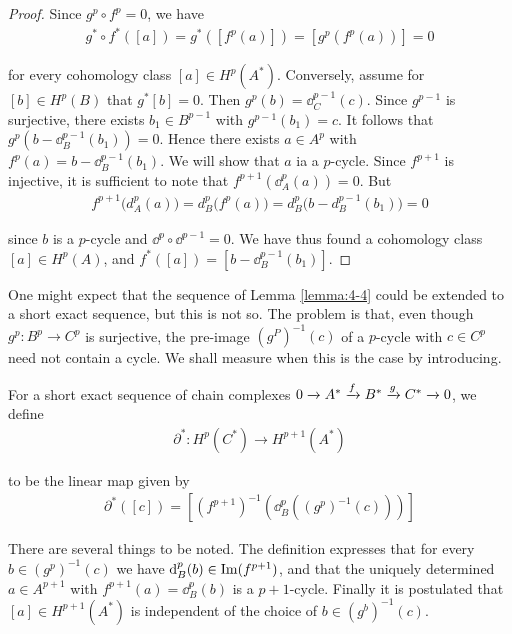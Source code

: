 \begin{proof}
  Since $g^p\circ f^p=0$, we have
  \begin{align*}
    g^*\circ f^*([ a ])=g^*([f^p(a)])=[g^p(f^p(a))]=0
  \end{align*}

  for every cohomology class $[a]\in H^p(A^*)$. Conversely, assume for $[b]\in H^p(B)$ that
  $g^*[b] = 0$. Then $g^p(b) = \dd^{p-1}_C(c)$. Since $g^{p-1}$ is surjective, there exists
  $b_1\in B^{p-1}$ with $g^{p-1}(b_1) = c$. It follows that $g^p(b-\dd^{p-1}_B(b_1)) = 0$. Hence
  there exists $a\in A^p$ with $f^p(a) = b-\dd^{p-1}_B(b_1)$. We will show that $a$ ia a $p$-cycle.
  Since $f^{p+1}$ is injective, it is sufficient to note that $f^{p+1}(\dd^p_A(a)) = 0$. But
  \begin{align*}
    f^{p+1}\big(d_A^p(a)\big)=d_B^p\big(f^p(a)\big)=d_B^p\big(b-d_B^{p-1}(b_1)\big) = 0
  \end{align*}

  since $b$ is a $p$-cycle and $\dd^p\circ\dd^{p-1} = 0$. We have thus found a cohomology class
  $[a]\in H^p(A)$, and $f^*([a]) = [b - \dd^{p-1}_B(b_1)]$.
\end{proof}


One might expect that the sequence of Lemma \ref{lemma:4-4} could be extended to a short
exact sequence, but this is not so. The problem is that, even though $g^p:B^p\to C^p$
is surjective, the pre-image $(g^P)^{-1}(c)$ of a $p$-cycle with $c\in C^p$ need not contain
a cycle. We shall measure when this is the case by introducing.


\begin{definition}\label{def:4-5}
  For a short exact sequence of chain complexes $0\xrightarrow[]{}A^*\xrightarrow[]{f}B^*\xrightarrow[]{g}C^*\xrightarrow[]{}0$, we define
  \begin{align*}
    \partial^*: H^p(C^*) \to H^{p+1}(A^*)
  \end{align*}

  to be the linear map given by
  \begin{align*}
    \partial^*([c]) = \left[\left(f^{p+1}\right)^{-1} \left(\dd^p_B\left((g^p)^{-1}(c)\right)\right)\right]
  \end{align*}
\end{definition}

There are several things to be noted. The definition expresses that for every $b\in (g^p)^{-1}(c)$ we have
$\mathrm{d}^p_B(b)\in\operatorname{Im}(f^{p+1})$, and that the uniquely determined $a\in A^{p+1}$ with $f^{p+1}(a) = \dd^p_B(b)$ is a
$p+1$-cycle. Finally it is postulated that $[a]\in H^{p+1}(A^*)$ is independent of the choice of $b\in (g^b)^{-1}(c)$.

